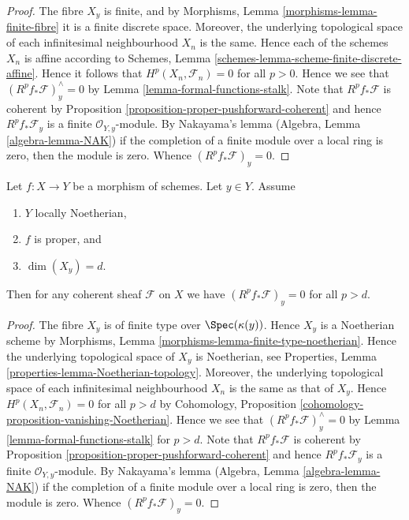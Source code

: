 \begin{proof}
The fibre $X_y$ is finite, and by
Morphisms, Lemma \ref{morphisms-lemma-finite-fibre} it
is a finite discrete space. Moreover, the underlying topological
space of each infinitesimal neighbourhood $X_n$ is the same.
Hence each of the schemes $X_n$ is affine according to
Schemes, Lemma \ref{schemes-lemma-scheme-finite-discrete-affine}.
Hence it follows that $H^p(X_n, \mathcal{F}_n) = 0$ for all
$p > 0$. Hence we see that $(R^pf_*\mathcal{F})_y^\wedge = 0$
by Lemma \ref{lemma-formal-functions-stalk}.
Note that $R^pf_*\mathcal{F}$ is coherent by
Proposition \ref{proposition-proper-pushforward-coherent} and
hence $R^pf_*\mathcal{F}_y$ is a finite
$\mathcal{O}_{Y, y}$-module. By Nakayama's lemma
(Algebra, Lemma \ref{algebra-lemma-NAK})
if the completion of a finite module over a local ring
is zero, then the module is zero. Whence
$(R^pf_*\mathcal{F})_y = 0$.
\end{proof}

\begin{lemma}
\label{lemma-higher-direct-images-zero-above-dimension-fibre}
Let $f : X \to Y$ be a morphism of schemes.
Let $y \in Y$.
Assume
\begin{enumerate}
\item $Y$ locally Noetherian,
\item $f$ is proper, and
\item $\dim(X_y) = d$.
\end{enumerate}
Then for any coherent sheaf $\mathcal{F}$ on $X$ we have
$(R^pf_*\mathcal{F})_y = 0$ for all $p > d$.
\end{lemma}

\begin{proof}
The fibre $X_y$ is of finite type over $\Spec(\kappa(y))$.
Hence $X_y$ is a Noetherian scheme by
Morphisms, Lemma \ref{morphisms-lemma-finite-type-noetherian}.
Hence the underlying topological space of $X_y$ is Noetherian, see
Properties, Lemma \ref{properties-lemma-Noetherian-topology}.
Moreover, the underlying topological space of each infinitesimal
neighbourhood $X_n$ is the same as that of $X_y$.
Hence $H^p(X_n, \mathcal{F}_n) = 0$ for all $p > d$ by
Cohomology, Proposition \ref{cohomology-proposition-vanishing-Noetherian}.
Hence we see that $(R^pf_*\mathcal{F})_y^\wedge = 0$
by Lemma \ref{lemma-formal-functions-stalk} for $p > d$.
Note that $R^pf_*\mathcal{F}$ is coherent by
Proposition \ref{proposition-proper-pushforward-coherent} and
hence $R^pf_*\mathcal{F}_y$ is a finite
$\mathcal{O}_{Y, y}$-module. By Nakayama's lemma
(Algebra, Lemma \ref{algebra-lemma-NAK})
if the completion of a finite module over a local ring
is zero, then the module is zero. Whence
$(R^pf_*\mathcal{F})_y = 0$.
\end{proof}








